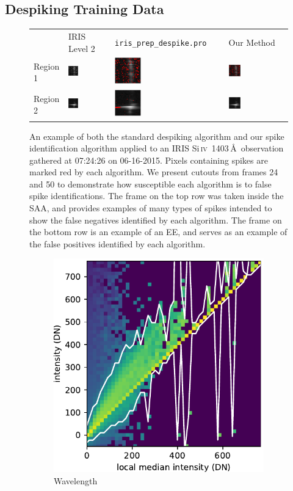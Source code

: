 \documentclass[10pt,letterpaper]{article}
\newcommand{\SiIV}{Si\,\textsc{iv}~1403\,\AA}
\newcommand{\tilewidth}{0.25\textwidth}
\newcommand{\EE}{\ac{EE}}
\newcommand{\SAA}{\ac{SAA}}
\begin{document}
		\subsection{Despiking Training Data}	\label{sec_dspk}	
			
			\begin{figure}[b!]
	
				\renewcommand{\arraystretch}{0}
				\setlength{\tabcolsep}{0pt}
				\begin{tabular}{m{} m{\tilewidth} m{\tilewidth} m{\tilewidth} @{}m{0pt}@{}}
					& \centering IRIS Level 2 & \centering \texttt{iris\_prep\_despike.pro} & \centering Our Method & \\[5mm]
					Region 1 & \includegraphics[width=\tilewidth]{fig/orig_1} & \includegraphics[width=\tilewidth]{fig/despike_1} & \includegraphics[width=\tilewidth]{fig/dspk_1} & \\
					Region 2 & \includegraphics[width=\tilewidth]{fig/orig_2} & \includegraphics[width=\tilewidth]{fig/despike_2} & \includegraphics[width=\tilewidth]{fig/dspk_2} & \\
				\end{tabular}
				
				\caption{An example of both the standard despiking algorithm and our spike identification algorithm applied to an IRIS \SiIV\ observation gathered at 07:24:26 on 06-16-2015.
					Pixels containing spikes are marked red by each algorithm.
					We present cutouts from frames 24 and 50 to demonstrate how susceptible each algorithm is to false spike identifications. 
					The frame on the top row was taken inside the \SAA, and provides examples of many types of spikes intended to show the false negatives identified by each algorithm.
					The frame on the bottom row is an example of an \EE, and serves as an example of the false positives identified by each algorithm.}
				
				\label{dspk_ex}
				
			\end{figure}
			
			\begin{figure}[t!]
				\centering
				\begin{subfigure}[t]{0.288\textwidth}
					\centering
					\includegraphics[width=\textwidth]{fig/hist_0}
					\caption{Wavelength}
				\end{subfigure}
				~ 
				\begin{subfigure}[t]{0.288\textwidth}
					\centeri
\end{subfigure}
\end{figure}
\end{document}
